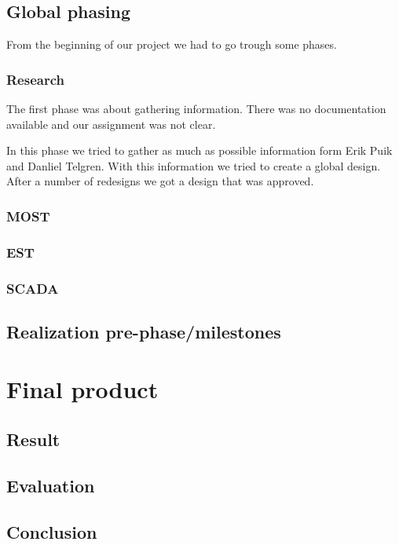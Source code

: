 \documentclass[12pt,a4paper]{report}
\begin{document}
\section{Global phasing}
From the beginning of our project we had to go trough some phases.

\subsection{Research}
The first phase was about gathering information.
There was no documentation available and our assignment was not clear.

In this phase we tried to gather as much as possible information form Erik Puik and Danliel Telgren.
With this information we tried to create a global design.
After a number of redesigns we got a design that was approved.

\subsection{MOST}


\subsection{EST}

\subsection{SCADA}

\section{Realization pre-phase/milestones}

\chapter{Final product}
\section{Result}

\section{Evaluation}

\section{Conclusion}
\end{document}
